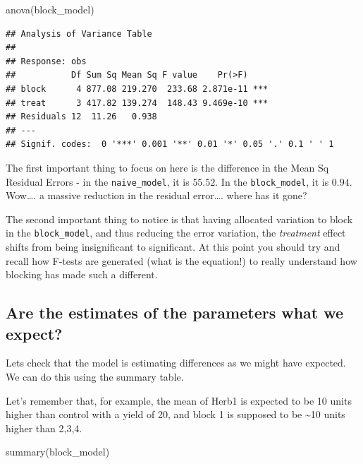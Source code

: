\documentclass[
]{book}
\newenvironment{Shaded}{\begin{snugshade}}{\end{snugshade}}
\newcommand{\FunctionTok}[1]{\textcolor[rgb]{0.00,0.00,0.00}{#1}}
\newcommand{\NormalTok}[1]{#1}
\begin{document}
\begin{Shaded}
\begin{Highlighting}[]
\FunctionTok{anova}\NormalTok{(block\_model)}
\end{Highlighting}
\end{Shaded}

\begin{verbatim}
## Analysis of Variance Table
## 
## Response: obs
##           Df Sum Sq Mean Sq F value    Pr(>F)    
## block      4 877.08 219.270  233.68 2.871e-11 ***
## treat      3 417.82 139.274  148.43 9.469e-10 ***
## Residuals 12  11.26   0.938                      
## ---
## Signif. codes:  0 '***' 0.001 '**' 0.01 '*' 0.05 '.' 0.1 ' ' 1
\end{verbatim}

The first important thing to focus on here is the difference in the Mean Sq Residual Errors - in the \texttt{naive\_model}, it is \(55.52\). In the \texttt{block\_model}, it is \(0.94\). Wow\ldots. a massive reduction in the residual error\ldots. where has it gone?

The second important thing to notice is that having allocated variation to block in the \texttt{block\_model}, and thus reducing the error variation, the \emph{treatment} effect shifts from being insignificant to significant. At this point you should try and recall how F-tests are generated (what is the equation!) to really understand how blocking has made such a different.

\hypertarget{are-the-estimates-of-the-parameters-what-we-expect}{%
\subsection{Are the estimates of the parameters what we expect?}\label{are-the-estimates-of-the-parameters-what-we-expect}}

Lets check that the model is estimating differences as we might have expected. We can do this using the summary table.

Let's remember that, for example, the mean of Herb1 is expected to be 10 units higher than control with a yield of 20, and block 1 is supposed to be \textasciitilde10 units higher than 2,3,4.

\begin{Shaded}
\begin{Highlighting}[]
\FunctionTok{summary}\NormalTok{(block\_model)}
\end{Highlighting}
\end{Shaded}
\end{document}
